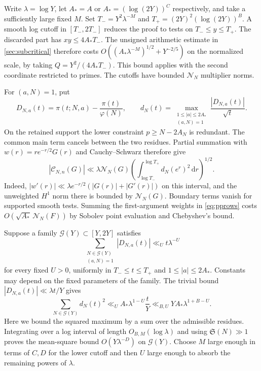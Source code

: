 \documentclass[11pt,a4paper]{article}
\numberwithin{equation}{section}
\newcommand{\SSS}{\mathfrak S}
\newcommand{\ud}{\mathrm d}
\newcommand{\NN}{\mathcal N_N}
\begin{document}
Write $\lambda=\log Y$, let $A_*=A$ or $A_*=(\log(2Y))^C$
respectively, and take a sufficiently large fixed $M$. Set
$T_-=Y^2\lambda^{-M}$ and $T_+=(2Y)^2(\log(2Y))^B$.
A smooth log cutoff in $[T_-,2T_-]$ reduces the proof to
tests on $T_-\le y\le T_+$. The discarded part has
$xy\le4A_*T_-$. The unsigned arithmetic estimate in
\cref{sec:subcritical} therefore costs
$O((A_*\lambda^{-M})^{1/2}+Y^{-2/5})$ on the
normalized scale, by taking $Q=Y^2/(4A_*T_-)$.
This bound applies with the second coordinate restricted
to primes. The cutoffs have bounded $\NN$ multiplier norms.

For $(a,N)=1$, put
\[
 D_{N,a}(t)=\pi(t;N,a)-\frac{\pi(t)}{\varphi(N)},
 \qquad
 d_N(t)=\max_{\substack{1\le |a|\le2A_*\\(a,N)=1}}
                  \frac{|D_{N,a}(t)|}{\sqrt t}.
\]
On the retained support the lower constraint $p\ge N-2A_N$
is redundant. The common main term cancels between the
two residues. Partial summation with
$w(r)=r e^{-r/2}G(r)$ and Cauchy--Schwarz therefore give
\[
 |\mathcal C_{N,n}(G)|
   \ll \lambda\NN(G)
          \left(\int_{\log T_-}^{\log T_+} d_N(e^r)^2\,
                              \ud r\right)^{1/2}.
\]
Indeed, $|w'(r)|\ll\lambda e^{-r/2}(|G(r)|+|G'(r)|)$
on this interval, and the unweighted $H^1$ norm there is
bounded by $\NN(G)$. Boundary terms vanish for supported
smooth tests. Summing the first-argument weights in
\cref{eq:pprows} costs $O(\sqrt{A_*}\,\NN(F))$ by Sobolev
point evaluation and Chebyshev's bound.

Suppose a family $\mathcal G(Y)\subset[Y,2Y]$ satisfies
\begin{equation}
 \sum_{\substack{N\in\mathcal G(Y)\\(a,N)=1}}
       |D_{N,a}(t)|\ll_U t\lambda^{-U}
 \label{eq:profiledistribution}
\end{equation}
for every fixed $U>0$, uniformly in $T_-\le t\le T_+$
and $1\le |a|\le 2A_*$. Constants may depend on the fixed
parameters of the family. The trivial bound
$|D_{N,a}(t)|\ll \lambda t/Y$ gives
\[
 \sum_{N\in\mathcal G(Y)}d_N(t)^2
       \ll_U A_* \lambda^{1-U}\frac{t}{Y}
       \ll_{B,U}Y A_*\lambda^{1+B-U}.
\]
Here we bound the squared maximum by a sum over the
admissible residues. Integrating over a log interval of
length $O_{B,M}(\log\lambda)$ and using $\SSS(N)\gg1$ proves
the mean-square bound $O(Y\lambda^{-D})$ on $\mathcal G(Y)$.
Choose $M$ large enough in terms of $C,D$ for the lower
cutoff and then $U$ large enough to absorb the remaining
powers of $\lambda$.
\end{document}

